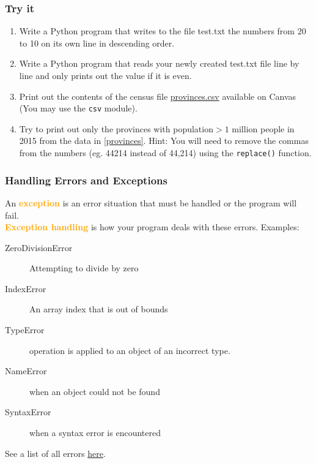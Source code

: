 \documentclass[xcolor=svgnames]{beamer}
\newcommand{\nl}{\\[1em]}
\newcommand{\define}[1]{\textbf{\textcolor{orange}{#1}}}
\newcommand{\ft}[1]{\frametitle{#1}}
\begin{document}




\begin{frame}\ft{Try it}
\begin{example}
\begin{enumerate}
\item  Write a Python program that writes to the file test.txt the numbers from 20 to 10 on its own line in descending order.

\item Write a Python program that reads your newly created test.txt file line by line and only prints out the value if it is even.

\item Print out the contents of the census file  \href{https://www150.statcan.gc.ca/t1/tbl1/en/tv.action?pid=1710000501}{provinces.csv} available on Canvas \label{provinces} (You may use the {\tt csv} module).

\item Try to print out only the provinces with population$ > 1 $ million people in 2015 from the data in \ref{provinces}.  Hint: You will need to remove the commas from the numbers (eg. 44214 instead of 44,214) using the {\tt replace()} function.

\end{enumerate}
\end{example}
\end{frame}



\begin{frame}\ft{Handling Errors and Exceptions}
An \define{exception} is an error situation that must be handled or the program will fail. \nl
\define{Exception handling} is how your program deals with these errors.
Examples:

\begin{description}
\item[ZeroDivisionError] Attempting to divide by zero
\item[IndexError] An array index that is out of bounds
\item[TypeError] operation is applied to an object of an incorrect type.
\item[NameError]  when an object could not be found
\item[SyntaxError] when a syntax error is encountered
\end{description}
See a list of all errors \href{https://www.tutorialsteacher.com/python/error-types-in-python}{here}.
\end{frame}
\end{document}
